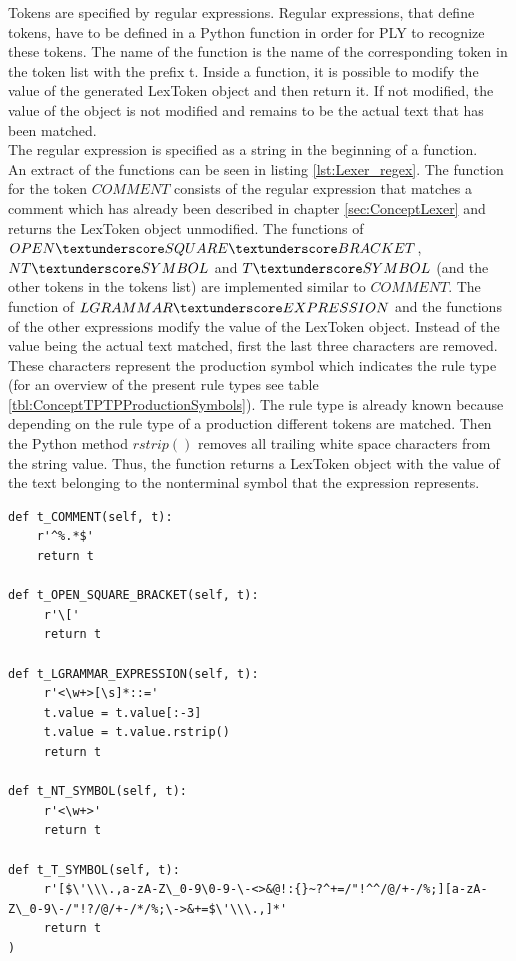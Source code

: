 Tokens are specified by regular expressions.
Regular expressions, that define tokens, have to be defined in a Python function in order for \ac{PLY} to recognize these tokens.
The name of the function is the name of the corresponding token in the token list with the prefix t\textunderscore .
Inside a function, it is possible to modify the value of the generated LexToken object and then return it.
If not modified, the value of the object is not modified and remains to be the actual text that has been matched.\\
The regular expression is specified as a string in the beginning of a function.\\
An extract of the functions can be seen in listing \ref{lst:Lexer_regex}.
The function for the token $COMMENT$ consists of the regular expression that matches a comment which has already been described in chapter \ref{sec:ConceptLexer} and returns the LexToken object unmodified.
The functions of $OPEN\textunderscore SQUARE\textunderscore BRACKET$, $NT\textunderscore SYMBOL$ and $T\textunderscore SYMBOL$ (and the other tokens in the tokens list) are implemented similar to $COMMENT$.
The function of $LGRAMMAR\textunderscore EXPRESSION$ and the functions of the other expressions modify the value of the LexToken object.
Instead of the value being the actual text matched, first the last three characters are removed.
These characters represent the production symbol which indicates the rule type (for an overview of the present rule types see table \ref{tbl:ConceptTPTPProductionSymbols}).
The rule type is already known because depending on the rule type of a production different tokens are matched.
Then the Python method $rstrip()$ removes all trailing white space characters from the string value.
Thus, the function returns a LexToken object with the value of the text belonging to the nonterminal symbol that the expression represents.\\

\begin{lstlisting}[language=None,basicstyle=\scriptsize	,caption= Lexer regular expressions,label= lst:Lexer_regex]
def t_COMMENT(self, t):
    r'^%.*$'
    return t

def t_OPEN_SQUARE_BRACKET(self, t):
     r'\['
     return t

def t_LGRAMMAR_EXPRESSION(self, t):
     r'<\w+>[\s]*::='
     t.value = t.value[:-3]
     t.value = t.value.rstrip()
     return t

def t_NT_SYMBOL(self, t):
     r'<\w+>'
     return t

def t_T_SYMBOL(self, t):
     r'[$\'\\\.,a-zA-Z\_0-9\0-9-\-<>&@!:{}~?^+=/"!^^/@/+-/%;][a-zA-Z\_0-9\-/"!?/@/+-/*/%;\->&+=$\'\\\.,]*'
     return t
)
\end{lstlisting}

